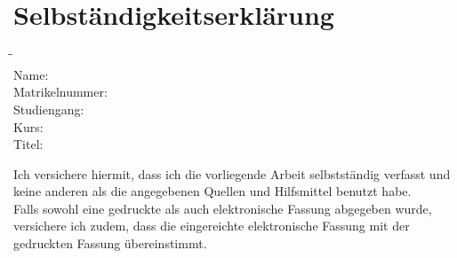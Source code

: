 \section*{Selbständigkeitserklärung}
\vspace{1cm}
\begin{tabbing}
    \hspace{.175\textwidth} \= \hspace{.825\textwidth}\=\kill\\
    Name:		            \> \myStudentenname\\
    Matrikelnummer:		    \> \myMatrikelnummer\\
    Studiengang:		    \> \myStudiengang\\
    Kurs:				    \> \myKurs\\
    Titel:	                \> \myTitle             \>\\
\end{tabbing}
\vspace{1cm}
Ich versichere hiermit, dass ich die vorliegende Arbeit selbstständig verfasst und
keine anderen als die angegebenen Quellen und Hilfsmittel benutzt habe.\\
Falls sowohl eine gedruckte als auch elektronische Fassung abgegeben wurde,
versichere ich zudem, dass die eingereichte elektronische Fassung mit der gedruckten
Fassung übereinstimmt.\\
\vspace{2cm}\\

